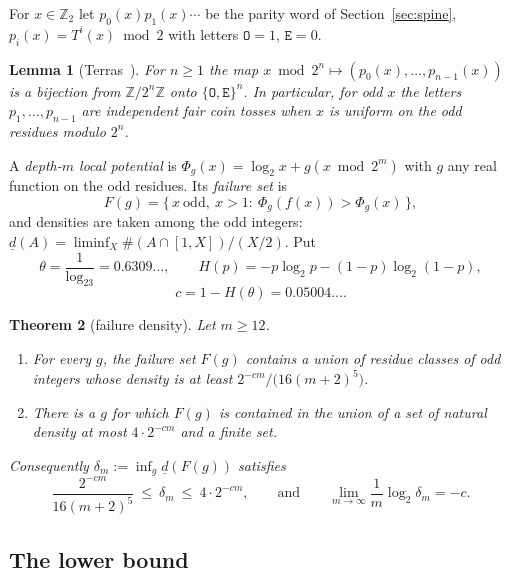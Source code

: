 \documentclass[11pt]{article}
\newtheorem{theorem}{Theorem}[section]
\newtheorem{lemma}[theorem]{Lemma}
\theoremstyle{definition}
\theoremstyle{remark}
\newcommand{\Z}{\mathbb{Z}}
\begin{document}
For $x\in\Z_2$ let $p_0(x)p_1(x)\cdots$ be the parity word of
Section~\ref{sec:spine}, $p_i(x)=T^{i}(x)\bmod2$ with letters
$\mathtt O=1$, $\mathtt E=0$.

\begin{lemma}[Terras~\cite{Terras1976}]\label{lem:terras}
For $n\ge1$ the map $x\bmod2^{n}\mapsto(p_0(x),\dots,p_{n-1}(x))$ is a
bijection from $\Z/2^{n}\Z$ onto $\{\mathtt O,\mathtt E\}^{n}$. In
particular, for odd $x$ the letters $p_1,\dots,p_{n-1}$ are independent
fair coin tosses when $x$ is uniform on the odd residues modulo $2^{n}$.
\end{lemma}

A \emph{depth-$m$ local potential} is $\Phi_g(x)=\log_2x+g(x\bmod2^{m})$
with $g$ any real function on the odd residues. Its \emph{failure set} is
\[
F(g)=\{\,x\ \text{odd},\ x>1:\ \Phi_g(f(x))>\Phi_g(x)\,\},
\]
and densities are taken among the odd integers:
$\underline d(A)=\liminf_X\#(A\cap[1,X])/(X/2)$. Put
\[
\theta=\frac1{\log_23}=0.6309\ldots,\qquad
H(p)=-p\log_2p-(1-p)\log_2(1-p),
\]
\[
c=1-H(\theta)=0.05004\ldots .
\]

\begin{theorem}[failure density]\label{thm:G}
Let $m\ge12$.
\begin{enumerate}
\item For every $g$, the failure set $F(g)$ contains a union of residue
  classes of odd integers whose density is at least
  $2^{-cm}/\bigl(16(m+2)^{5}\bigr)$.
\item There is a $g$ for which $F(g)$ is contained in the union of a set
  of natural density at most $4\cdot2^{-cm}$ and a finite set.
\end{enumerate}
Consequently $\delta_m:=\inf_g\underline d(F(g))$ satisfies
\[
\frac{2^{-cm}}{16(m+2)^{5}}\ \le\ \delta_m\ \le\ 4\cdot2^{-cm},
\qquad\text{and}\qquad
\lim_{m\to\infty}\frac1m\log_2\delta_m=-c .
\]
\end{theorem}

\subsection*{The lower bound}
\end{document}
